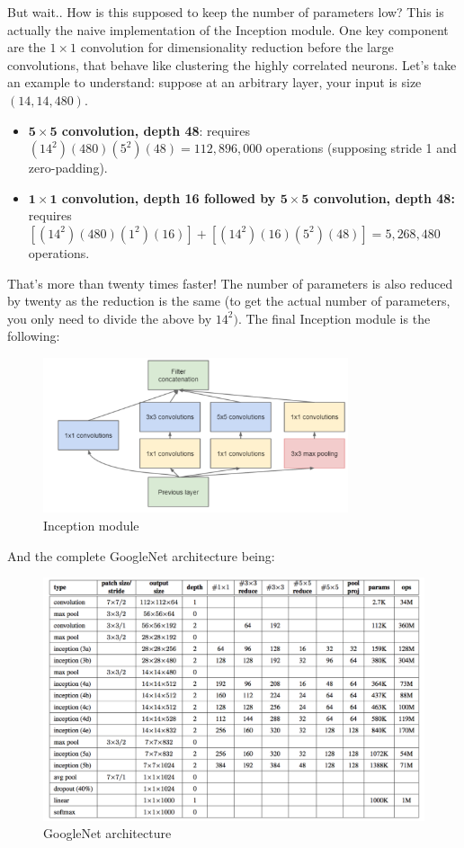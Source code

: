 But wait.. How is this supposed to keep the number of parameters low? This is actually the naive implementation of the Inception module. One key component are the $1\times 1$ convolution for dimensionality reduction before the large convolutions, that behave like clustering the highly correlated neurons. Let's take an example to understand: suppose at an arbitrary layer, your input is size $(14, 14, 480)$.
\begin{itemize}
\item \textbf{$\mathbf{5\times 5}$ convolution, depth 48}: requires $(14^2)(480)(5^2)(48) = 112,896,000$ operations (supposing stride 1 and zero-padding).
\item \textbf{$\mathbf{1\times 1}$ convolution, depth 16 followed by $\mathbf{5\times 5}$ convolution, depth 48:} requires $[(14^2)(480)(1^2)(16)] + [(14^2)(16)(5^2)(48)] = 5,268,480$ operations.
\end{itemize}

That's more than twenty times faster! The number of parameters is also reduced by twenty as the reduction is the same (to get the actual number of parameters, you only need to divide the above by $14^2)$. The final Inception module is the following:

\begin{figure}[H]
    \centering
    \includegraphics[width=0.8\textwidth]{Images/inception.png}
    \caption{Inception module \cite{googlenet}}
\end{figure}

And the complete GoogleNet architecture being:

\begin{figure}[H]
    \centering
    \includegraphics[width=\textwidth]{Images/googlenet.png}
    \caption{GoogleNet architecture\cite{googlenet}}
\end{figure}

